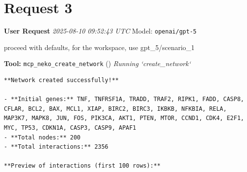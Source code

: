\documentclass[11pt,a4paper]{article}
\begin{document}
\section{Request 3}
\begin{userbox}
\textbf{User Request}
\quad \textit{2025-08-10 09:52:43 UTC}
\quad Model: \texttt{openai/gpt-5}

proceed with defaults, for the workspace, use gpt\_5/scenario\_1

\end{userbox}
\begin{toolokbox}
\textbf{Tool:} \texttt{mcp\_neko\_create\_network} (\checkmark)
\textit{Running `create\_network`}
\begin{lstlisting}
**Network created successfully!**

- **Initial genes:** TNF, TNFRSF1A, TRADD, TRAF2, RIPK1, FADD, CASP8, CFLAR, BCL2, BAX, MCL1, XIAP, BIRC2, BIRC3, IKBKB, NFKBIA, RELA, MAP3K7, MAPK8, JUN, FOS, PIK3CA, AKT1, PTEN, MTOR, CCND1, CDK4, E2F1, MYC, TP53, CDKN1A, CASP3, CASP9, APAF1
- **Total nodes:** 200
- **Total interactions:** 2356

**Preview of interactions (first 100 rows):**


\end{lstlisting}
\end{toolokbox}
\end{document}
